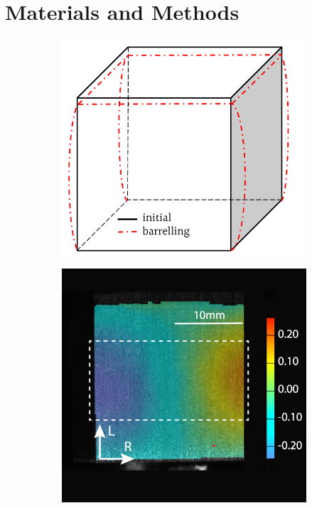 \documentclass[review]{elsarticle}
\begin{document}
\section{Materials and Methods}

\begin{figure}
    \centering
    \begin{subfigure}[b]{0.4\textwidth}
        \centering
        \includegraphics[width=\textwidth]{BarellingEffectZoomed.pdf}
        \caption{}
        \label{fig:barrelling}
    \end{subfigure}
    \hfill
    \begin{subfigure}[b]{0.4\textwidth}
        \centering
        \includegraphics[width=\textwidth]{experiment.png}

\end{subfigure}
\end{figure}
\end{document}
